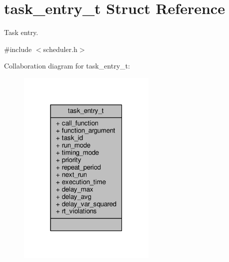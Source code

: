 \hypertarget{structtask__entry__t}{\section{task\+\_\+entry\+\_\+t Struct Reference}
\label{structtask__entry__t}
}


Task entry.  




{\ttfamily \#include $<$scheduler.\+h$>$}



Collaboration diagram for task\+\_\+entry\+\_\+t\+:
\nopagebreak
\begin{figure}[H]
\begin{center}
\leavevmode
\includegraphics[width=187pt]{structtask__entry__t__coll__graph}
\end{center}
\end{figure}
